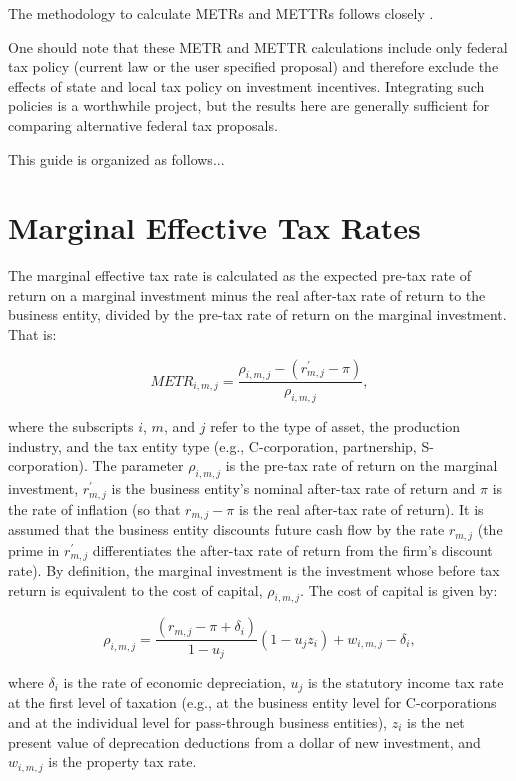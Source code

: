 \documentclass[article,11pt,letterpaper,fleqn]{article}
\theoremstyle{definition}
\numberwithin{equation}{section}
\newcommand{\cn}{\citeasnoun} %
\begin{document}
The methodology to calculate METRs and METTRs follows closely \cn{CBO_ETRs}.

One should note that these METR and METTR calculations include only federal tax policy (current law or the user specified proposal) and therefore exclude the effects of state and local tax policy on investment incentives.  Integrating such policies is a worthwhile project, but the results here are generally sufficient for comparing alternative federal tax proposals.


This guide is organized as follows...

\section{Marginal Effective Tax Rates}

The marginal effective tax rate is calculated as the expected pre-tax rate of return on a marginal investment minus the real after-tax rate of return to the business entity, divided by the pre-tax rate of return on the marginal investment.  That is: 

\begin{equation}
METR_{i,m,j} = \frac{\rho_{i,m,j} - (r^{'}_{m,j}-\pi)}{\rho_{i,m,j}},
\end{equation}

\noindent\noindent where the subscripts $i$, $m$, and $j$ refer to the type of asset, the production industry, and the tax entity type (e.g., C-corporation, partnership, S-corporation).  The parameter $\rho_{i,m,j}$ is the pre-tax rate of return on the marginal investment, $r^{'}_{m,j}$ is the business entity's nominal after-tax rate of return and $\pi$ is the rate of inflation (so that $r_{m,j}-\pi$ is the real after-tax rate of return).  It is assumed that the business entity discounts future cash flow by the rate $r_{m,j}$ (the prime in $r^{'}_{m,j}$ differentiates the after-tax rate of return from the firm's discount rate).  By definition, the marginal investment is the investment whose before tax return is equivalent to the cost of capital, $\rho_{i,m,j}$.  The cost of capital is given by:

\begin{equation}
\rho_{i,m,j} = \frac{(r_{m,j}-\pi+\delta_{i})}{1-u_{j}}(1-u_{j}z_{i})+w_{i,m,j}-\delta_{i},
\end{equation}  

\noindent\noindent where $\delta_{i}$ is the rate of economic depreciation, $u_{j}$ is the statutory income tax rate at the first level of taxation (e.g., at the business entity level for C-corporations and at the individual level for pass-through business entities), $z_{i}$ is the net present value of deprecation deductions from a dollar of new investment, and $w_{i,m,j}$ is the property tax rate.  
\end{document}
